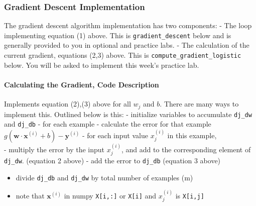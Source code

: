 \documentclass[11pt]{article}
\providecommand{\tightlist}{%
      \setlength{\itemsep}{0pt}\setlength{\parskip}{0pt}}
\begin{document}
    \hypertarget{gradient-descent-implementation}{%
\subsubsection{Gradient Descent
Implementation}\label{gradient-descent-implementation}}

The gradient descent algorithm implementation has two components: - The
loop implementing equation (1) above. This is \texttt{gradient\_descent}
below and is generally provided to you in optional and practice labs. -
The calculation of the current gradient, equations (2,3) above. This is
\texttt{compute\_gradient\_logistic} below. You will be asked to
implement this week's practice lab.

\hypertarget{calculating-the-gradient-code-description}{%
\paragraph{Calculating the Gradient, Code
Description}\label{calculating-the-gradient-code-description}}

Implements equation (2),(3) above for all \(w_j\) and \(b\). There are
many ways to implement this. Outlined below is this: - initialize
variables to accumulate \texttt{dj\_dw} and \texttt{dj\_db} - for each
example - calculate the error for that example
\(g(\mathbf{w} \cdot \mathbf{x}^{(i)} + b) - \mathbf{y}^{(i)}\) - for
each input value \(x_{j}^{(i)}\) in this example,\\
- multiply the error by the input \(x_{j}^{(i)}\), and add to the
corresponding element of \texttt{dj\_dw}. (equation 2 above) - add the
error to \texttt{dj\_db} (equation 3 above)

\begin{itemize}
\tightlist
\item
  divide \texttt{dj\_db} and \texttt{dj\_dw} by total number of examples
  (m)
\item
  note that \(\mathbf{x}^{(i)}\) in numpy \texttt{X{[}i,:{]}} or
  \texttt{X{[}i{]}} and \(x_{j}^{(i)}\) is \texttt{X{[}i,j{]}}
\end{itemize}
\end{document}

